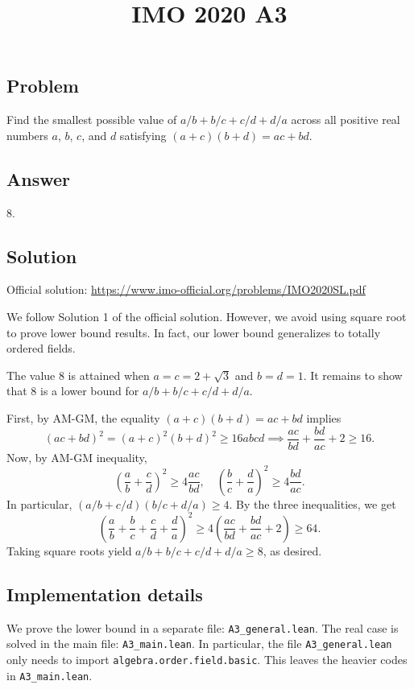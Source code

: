 \documentclass{article}
\title{IMO 2020 A3}
\author{}
\date{}
\begin{document}
\maketitle



\subsection*{Problem}

Find the smallest possible value of $a/b + b/c + c/d + d/a$ across all positive real numbers $a$, $b$, $c$, and $d$ satisfying $(a + c)(b + d) = ac + bd$.



\subsection*{Answer}

$8$.


\subsection*{Solution}

Official solution: \url{https://www.imo-official.org/problems/IMO2020SL.pdf}

We follow Solution 1 of the official solution.
However, we avoid using square root to prove lower bound results.
In fact, our lower bound generalizes to totally ordered fields.

The value $8$ is attained when $a = c = 2 + \sqrt{3}$ and $b = d = 1$.
It remains to show that $8$ is a lower bound for $a/b + b/c + c/d + d/a$.

First, by AM-GM, the equality $(a + c)(b + d) = ac + bd$ implies
\[ (ac + bd)^2 = (a + c)^2 (b + d)^2 \geq 16 abcd \implies \frac{ac}{bd} + \frac{bd}{ac} + 2 \geq 16. \]
Now, by AM-GM inequality,
\[ \left(\frac{a}{b} + \frac{c}{d}\right)^2 \geq 4\frac{ac}{bd}, \quad \left(\frac{b}{c} + \frac{d}{a}\right)^2 \geq 4\frac{bd}{ac}. \]
In particular, $(a/b + c/d)(b/c + d/a) \geq 4$.
By the three inequalities, we get
\[ \left(\frac{a}{b} + \frac{b}{c} + \frac{c}{d} + \frac{d}{a}\right)^2 \geq 4\left(\frac{ac}{bd} + \frac{bd}{ac} + 2\right) \geq 64. \]
Taking square roots yield $a/b + b/c + c/d + d/a \geq 8$, as desired.



\subsection*{Implementation details}

We prove the lower bound in a separate file: \texttt{A3\_general.lean}.
The real case is solved in the main file: \texttt{A3\_main.lean}.
In particular, the file \texttt{A3\_general.lean} only needs to import \texttt{algebra.order.field.basic}.
This leaves the heavier codes in \texttt{A3\_main.lean}.
\end{document}
